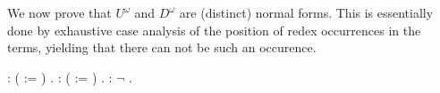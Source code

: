 We now prove that $U^\omega$ and $D^\omega$ are (distinct) normal
forms. This is essentially done by exhaustive case analysis of
the position of redex occurrences in the terms, yielding that there
can not be such an occurence.
\begin{singlespace}
\begin{coqdoccode}
\coqdocnoindent
{}  :
( :=
)
.\coqdoceol
\coqdocemptyline
\coqdocnoindent
{}  :
( :=
)
.\coqdoceol
\coqdocemptyline
\coqdocnoindent
{}
 :
\ensuremath{\lnot}
.\coqdoceol
\end{coqdoccode}
\end{singlespace}

